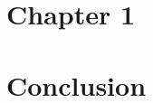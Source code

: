 \documentclass{Configuration_Files/Unive_Thesis}
\begin{document}
%
%
%    
%

\mainmatter %


\chapter{Chapter 1}


\chapter{Conclusion}




\end{document}
